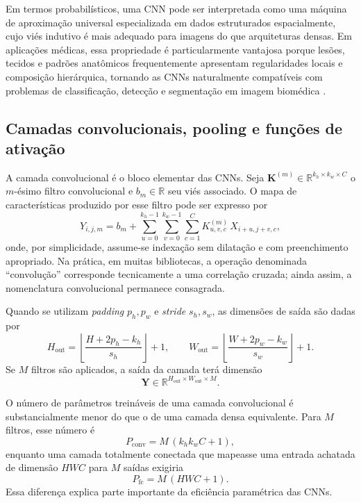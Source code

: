 \documentclass[tcc,capa]{texufpel}
\begin{document}
Em termos probabilísticos, uma CNN pode ser interpretada como uma máquina de aproximação universal especializada em dados estruturados espacialmente, cujo viés indutivo é mais adequado para imagens do que arquiteturas densas. Em aplicações médicas, essa propriedade é particularmente vantajosa porque lesões, tecidos e padrões anatômicos frequentemente apresentam regularidades locais e composição hierárquica, tornando as CNNs naturalmente compatíveis com problemas de classificação, detecção e segmentação em imagem biomédica \cite{Yamashita2018,Zhou2021}.

\subsection{Camadas convolucionais, pooling e funções de ativação}

A camada convolucional é o bloco elementar das CNNs. Seja $\mathbf{K}^{(m)} \in \mathbb{R}^{k_h \times k_w \times C}$ o $m$-ésimo filtro convolucional e $b_m \in \mathbb{R}$ seu viés associado. O mapa de características produzido por esse filtro pode ser expresso por
\begin{equation}
Y_{i,j,m}
=
b_m + \sum_{u=0}^{k_h-1}\sum_{v=0}^{k_w-1}\sum_{c=1}^{C}
K^{(m)}_{u,v,c}\,X_{i+u,j+v,c},
\end{equation}
onde, por simplicidade, assume-se indexação sem dilatação e com preenchimento apropriado. Na prática, em muitas bibliotecas, a operação denominada ``convolução'' corresponde tecnicamente a uma correlação cruzada; ainda assim, a nomenclatura convolucional permanece consagrada.

Quando se utilizam \textit{padding} $p_h,p_w$ e \textit{stride} $s_h,s_w$, as dimensões de saída são dadas por
\begin{equation}
H_{\text{out}} = \left\lfloor \frac{H + 2p_h - k_h}{s_h} \right\rfloor + 1,
\qquad
W_{\text{out}} = \left\lfloor \frac{W + 2p_w - k_w}{s_w} \right\rfloor + 1.
\end{equation}
Se $M$ filtros são aplicados, a saída da camada terá dimensão
\begin{equation}
\mathbf{Y} \in \mathbb{R}^{H_{\text{out}} \times W_{\text{out}} \times M}.
\end{equation}

O número de parâmetros treináveis de uma camada convolucional é substancialmente menor do que o de uma camada densa equivalente. Para $M$ filtros, esse número é
\begin{equation}
P_{\text{conv}} = M\,(k_h k_w C + 1),
\end{equation}
enquanto uma camada totalmente conectada que mapeasse uma entrada achatada de dimensão $HWC$ para $M$ saídas exigiria
\begin{equation}
P_{\text{fc}} = M\,(HWC + 1).
\end{equation}
Essa diferença explica parte importante da eficiência paramétrica das CNNs.
\end{document}

